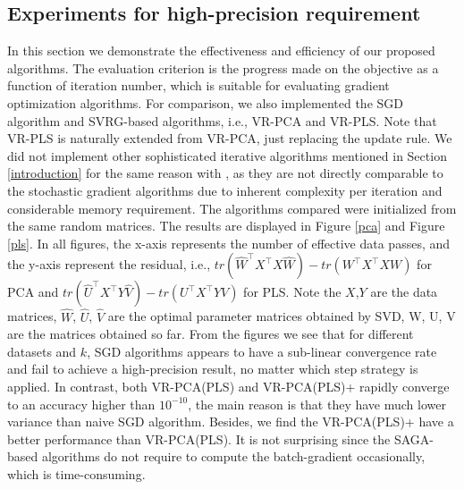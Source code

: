 \documentclass[runningheads,a4paper]{llncs}
\begin{document}
 \subsection{Experiments for high-precision requirement}
 In this section we demonstrate the effectiveness and efficiency of our proposed algorithms. The evaluation criterion is the progress made on the objective as a function of iteration number, which is suitable for evaluating gradient optimization algorithms. 
 For comparison, we also implemented the SGD algorithm and SVRG-based algorithms, i.e., VR-PCA and VR-PLS. Note that VR-PLS is naturally extended from VR-PCA, just replacing the update rule.
 We did not implement other sophisticated iterative algorithms mentioned in Section \ref{introduction} for the same reason with \citep{Shamir2015A}, as they are not directly comparable to the stochastic gradient algorithms due to inherent complexity per iteration and considerable memory requirement.
  The algorithms compared were initialized from the same random matrices. The results are displayed in Figure \ref{pca} and Figure \ref{pls}.
  In all figures, the x-axis represents the number of effective data passes,
  and the y-axis represent the residual, i.e., $tr(\hat{W}^{\top}X^{\top}X\hat{W}) - tr(W^{\top}X^{\top}XW)$ for PCA and $tr(\hat{U}^{\top}X^{\top}Y\hat{V}) - tr(U^{\top}X^{\top}YV)$ for PLS. Note the $X$,$Y$ are the data matrices, $\hat{W}$, $\hat{U}$, $\hat{V}$ are the optimal parameter matrices obtained by SVD, W, U, V are the matrices obtained so far. 
 From the figures we see that for different datasets and $k$, SGD algorithms appears to have a sub-linear convergence rate and fail to achieve a high-precision result, no matter which step strategy is applied.
In contrast, both VR-PCA(PLS) and VR-PCA(PLS)+ rapidly converge to an accuracy higher than $10^{-10}$, the main reason is that they have much lower variance than naive SGD algorithm. Besides, we  find the VR-PCA(PLS)+ have a better performance than VR-PCA(PLS). It is not surprising since the SAGA-based algorithms do not require to compute the batch-gradient occasionally, which is time-consuming.
 
\end{document}
